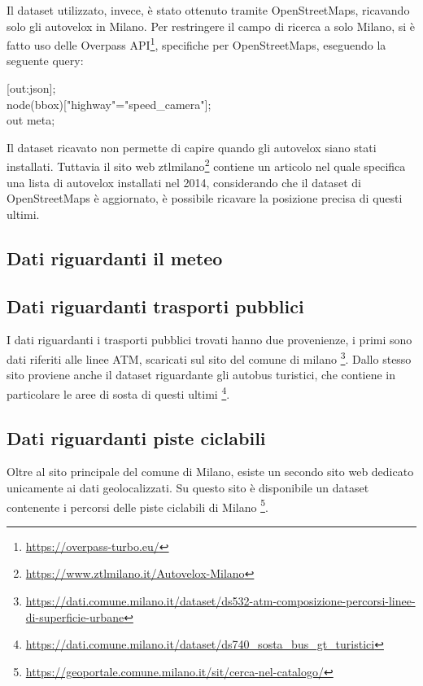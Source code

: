 \documentclass[a4paper]{report}
\begin{document}
Il dataset utilizzato, invece, è stato ottenuto tramite OpenStreetMaps, ricavando solo gli autovelox 
in Milano. 
Per restringere il campo di ricerca a solo Milano, si è fatto uso delle Overpass API\footnote{\url{https://overpass-turbo.eu/}}, 
specifiche per OpenStreetMaps, eseguendo la seguente query: 

[out:json];\\
node({{bbox}})["highway"="speed\_camera"];\\
out meta;

Il dataset ricavato non permette di capire quando gli autovelox siano stati installati.
Tuttavia il sito web ztlmilano\footnote{\url{https://www.ztlmilano.it/Autovelox-Milano}} 
contiene un articolo nel quale specifica una lista di 
autovelox installati nel 2014, considerando che il dataset di OpenStreetMaps è aggiornato, 
è possibile ricavare la posizione precisa di questi ultimi.

\subsection{Dati riguardanti il meteo}

\subsection{Dati riguardanti trasporti pubblici}
I dati riguardanti i trasporti pubblici trovati hanno due provenienze, i primi sono 
dati riferiti alle linee ATM, scaricati sul sito del comune di milano
\footnote{\url{https://dati.comune.milano.it/dataset/ds532-atm-composizione-percorsi-linee-di-superficie-urbane}}.
Dallo stesso sito proviene anche il dataset riguardante gli autobus turistici, che 
contiene in particolare le aree di sosta di questi ultimi
\footnote{\url{https://dati.comune.milano.it/dataset/ds740_sosta_bus_gt_turistici}}.

\subsection{Dati riguardanti piste ciclabili}
Oltre al sito principale del comune di Milano, esiste un secondo sito web dedicato 
unicamente ai dati geolocalizzati. Su questo sito è disponibile un dataset contenente 
i percorsi delle piste ciclabili di Milano
\footnote{\url{https://geoportale.comune.milano.it/sit/cerca-nel-catalogo/}}.
\end{document}

